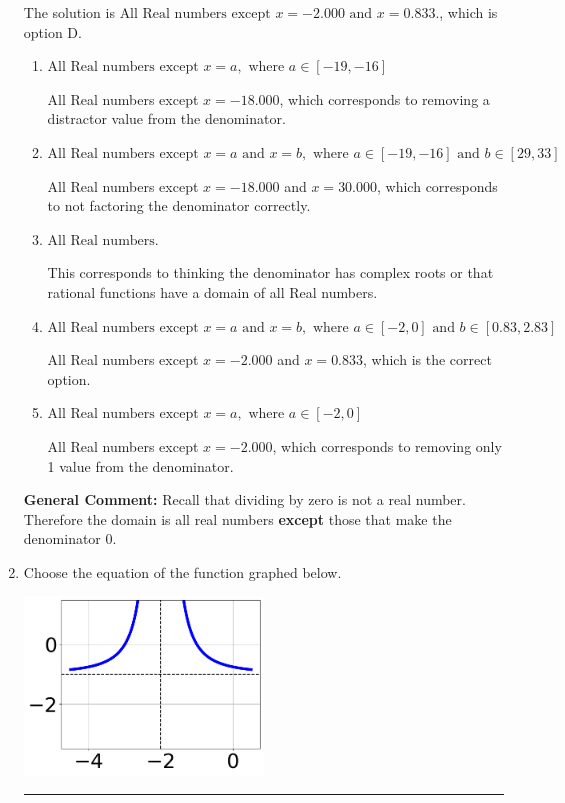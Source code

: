 \documentclass{extbook}[14pt]
\newcommand{\litem}[1]{\item #1

\rule{\textwidth}{0.4pt}}
\begin{document}
\begin{enumerate}
{The solution is \( \text{All Real numbers except } x = -2.000 \text{ and } x = 0.833. \), which is option D.\begin{enumerate}[label=\Alph*.]
\item \( \text{All Real numbers except } x = a, \text{ where } a \in [-19, -16] \)

All Real numbers except $x = -18.000$, which corresponds to removing a distractor value from the denominator.
\item \( \text{All Real numbers except } x = a \text{ and } x = b, \text{ where } a \in [-19, -16] \text{ and } b \in [29, 33] \)

All Real numbers except $x = -18.000$ and $x = 30.000$, which corresponds to not factoring the denominator correctly.
\item \( \text{All Real numbers.} \)

This corresponds to thinking the denominator has complex roots or that rational functions have a domain of all Real numbers.
\item \( \text{All Real numbers except } x = a \text{ and } x = b, \text{ where } a \in [-2, 0] \text{ and } b \in [0.83, 2.83] \)

All Real numbers except $x = -2.000$ and $x = 0.833$, which is the correct option.
\item \( \text{All Real numbers except } x = a, \text{ where } a \in [-2, 0] \)

All Real numbers except $x = -2.000$, which corresponds to removing only 1 value from the denominator.
\end{enumerate}

\textbf{General Comment:} Recall that dividing by zero is not a real number. Therefore the domain is all real numbers \textbf{except} those that make the denominator 0.
}
\litem{
Choose the equation of the function graphed below.

\begin{center}
    \includegraphics[width=0.5\textwidth]{../Figures/rationalGraphToEquationCopyB.png}
\end{center}




}
\end{enumerate}
\end{document}
